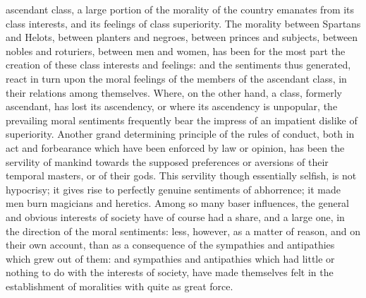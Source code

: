 \documentclass[12pt]{report}
\begin{document}
ascendant class, a large portion of the morality of the country emanates from its class interests, and its feelings of class superiority. The morality between Spartans and Helots, between planters and negroes, between princes and subjects, between nobles and roturiers, between men and women, has been for the most part the creation of these class interests and feelings: and the sentiments thus generated, react in turn upon the moral feelings of the members of the ascendant class, in their relations among themselves. Where, on the other hand, a class, formerly ascendant, has lost its ascendency, or where its ascendency is unpopular, the prevailing moral sentiments frequently bear the impress of an impatient dislike of superiority. Another grand determining principle of the rules of conduct, both in act and forbearance which have been enforced by law or opinion, has been the servility of mankind towards the supposed preferences or aversions of their temporal masters, or of their gods. This servility though essentially selfish, is not hypocrisy; it gives rise to perfectly genuine sentiments of abhorrence; it made men burn magicians and heretics. Among so many baser influences, the general and obvious interests of society have of course had a share, and a large one, in the direction of the moral sentiments: less, however, as a matter of reason, and on their own account, than as a consequence of the sympathies and antipathies which grew out of them: and sympathies and antipathies which had little or nothing to do with the interests of society, have made themselves felt in the establishment of moralities with quite as great force.
\end{document}
